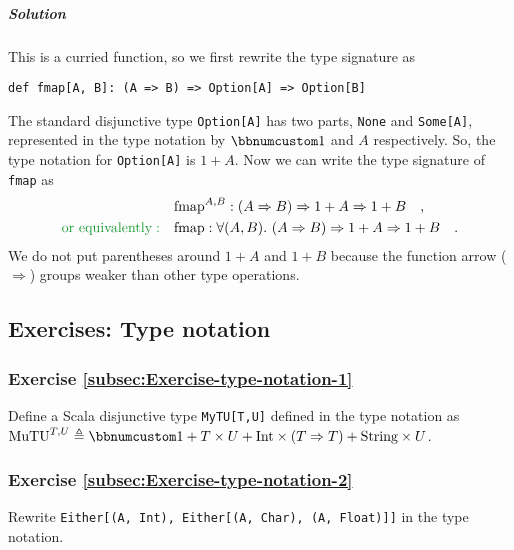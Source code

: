 \subparagraph{Solution}

This is a curried function, so we first rewrite the type signature
as
\begin{lstlisting}
def fmap[A, B]: (A => B) => Option[A] => Option[B]
\end{lstlisting}
The standard disjunctive type \lstinline!Option[A]!
has two parts, \lstinline!None!
and \lstinline!Some[A]!,
represented in the type notation by $\bbnum 1$ and $A$ respectively.
So, the type notation for \lstinline!Option[A]!
is $1+A$. Now we can write the type signature of \lstinline!fmap!
as
\begin{align*}
 & \text{fmap}^{A,B}:\left(A\Rightarrow B\right)\Rightarrow1+A\Rightarrow1+B\quad,\\
{\color{greenunder}\text{or equivalently}:}\quad & \text{fmap}:\forall(A,B).\,\left(A\Rightarrow B\right)\Rightarrow1+A\Rightarrow1+B\quad.
\end{align*}
We do not put parentheses around $1+A$ and $1+B$ because the function
arrow ($\Rightarrow$) groups weaker than other type operations. 

\subsection{Exercises: Type notation}

\subsubsection{Exercise \label{subsec:Exercise-type-notation-1}\ref{subsec:Exercise-type-notation-1}}

Define a Scala disjunctive type \lstinline!MyTU[T,U]!
defined in the type notation as $\text{MuTU}^{T,U}\triangleq\bbnum 1+T\times U+\text{Int}\times(T\Rightarrow T)+\text{String}\times U$.

\subsubsection{Exercise \label{subsec:Exercise-type-notation-2}\ref{subsec:Exercise-type-notation-2}}

Rewrite \lstinline!Either[(A, Int), Either[(A, Char), (A, Float)]]!
in the type notation.

